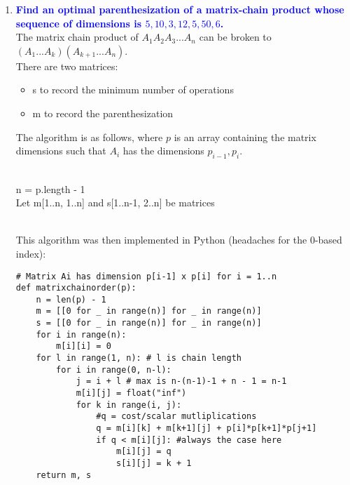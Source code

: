 \documentclass[11pt]{article}
\begin{document}
\begin{enumerate}
    
\item \textbf{\textcolor{blue}{Find an optimal parenthesization of a matrix-chain product whose sequence of dimensions is $5,10,3,12,5,50,6$.}}
    \\ The matrix chain product of $A_1A_2A_3...A_n$ can be broken to $(A_1...A_k)(A_{k+1}...A_n)$.
    \\ There are two matrices:
    \begin{itemize}
        \item s to record the minimum number of operations
        \item m to record the parenthesization
    \end{itemize}
    The algorithm is as follows, where $p$ is an array containing the matrix dimensions such that $A_i$ has the dimensions $p_{i-1}, p_i$.
    \begin{algorithm}
        \Indm{}\\
        \Indp
            n = p.length - 1 \\
            Let m[1..n, 1..n] and s[1..n-1, 2..n] be matrices \\
    \end{algorithm}
    \\ This algorithm was then implemented in Python (headaches for the 0-based index): \\
    \begin{verbatim}
# Matrix Ai has dimension p[i-1] x p[i] for i = 1..n
def matrixchainorder(p):
    n = len(p) - 1
    m = [[0 for _ in range(n)] for _ in range(n)]
    s = [[0 for _ in range(n)] for _ in range(n)]
    for i in range(n):
        m[i][i] = 0
    for l in range(1, n): # l is chain length
        for i in range(0, n-l):
            j = i + l # max is n-(n-1)-1 + n - 1 = n-1 
            m[i][j] = float("inf")
            for k in range(i, j):
                #q = cost/scalar mutliplications
                q = m[i][k] + m[k+1][j] + p[i]*p[k+1]*p[j+1]
                if q < m[i][j]: #always the case here
                    m[i][j] = q
                    s[i][j] = k + 1
    return m, s


\end{verbatim}
\end{enumerate}
\end{document}
